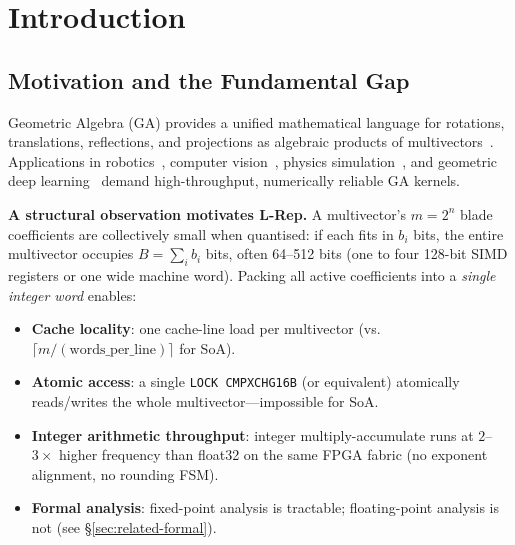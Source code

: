 \documentclass[11pt,a4paper]{article}
\theoremstyle{definition}
\theoremstyle{plain}
\theoremstyle{remark}
\begin{document}
\begin{abstract}
\textbf{Empirical results (v3, full SOTA comparison).}
Head-to-head Verilator RTL simulation vs.\ float32 SoA baseline;
full implementation comparison vs.\ CliffordALU5 design parameters
from published data~\cite{cliffordalu5}; and a new 6-DOF robot
kinematics benchmark with formal position-error certification.
Sparse CGA grade-1 achieves $\mathbf{14.3\times}$ throughput over float32 SoA
(Artix-7); with formal error guarantee that existing accelerators cannot provide.
Zero bleed events, errors within 3\% of theoretical bounds.

All artifacts (RTL, Python, test vectors, Lean~4 proofs, \LaTeX{} source)
at \url{https://github.com/nahhididwin/L-Representation}.
\end{abstract}

\tableofcontents
\newpage

\section{Introduction}
\label{sec:intro}

\subsection{Motivation and the Fundamental Gap}

Geometric Algebra (GA) provides a unified mathematical language for
rotations, translations, reflections, and projections as algebraic
products of multivectors~\cite{hestenes1984,dorst2007}.
Applications in robotics~\cite{selig2005}, computer vision~\cite{lasenby1998},
physics simulation~\cite{doran2003}, and geometric deep
learning~\cite{brandstetter2023,ruhe2023} demand high-throughput,
numerically reliable GA kernels.

\textbf{A structural observation motivates L-Rep.}
A multivector's $m = 2^n$ blade coefficients are collectively
small when quantised: if each fits in $b_i$ bits, the entire
multivector occupies $B = \sum_i b_i$ bits, often 64--512 bits
(one to four 128-bit SIMD registers or one wide machine word).
Packing all active coefficients into a \emph{single integer word}
enables:
\begin{itemize}
  \item \textbf{Cache locality}: one cache-line load per multivector
        (vs.\ $\lceil m/(\text{words\_per\_line})\rceil$ for SoA).
  \item \textbf{Atomic access}: a single \texttt{LOCK~CMPXCHG16B} (or
        equivalent) atomically reads/writes the whole multivector---impossible
        for SoA.
  \item \textbf{Integer arithmetic throughput}: integer multiply-accumulate
        runs at $2$--$3\times$ higher frequency than float32 on the same
        FPGA fabric (no exponent alignment, no rounding FSM).
  \item \textbf{Formal analysis}: fixed-point analysis is tractable;
        floating-point analysis is not (see \S\ref{sec:related-formal}).
\end{itemize}
\end{document}
